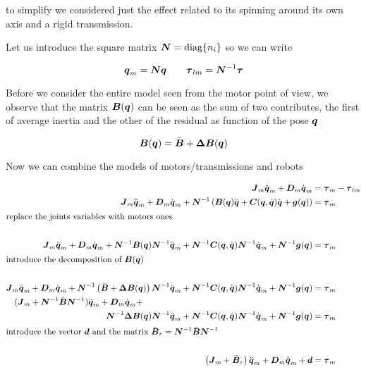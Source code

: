 to simplify we considered just the effect related to its spinning around its own axis and a rigid transmission.

Let us introduce the square matrix $\boldsymbol{N} = \operatorname{diag}\{n_i\}$ so we can write

\[
    \boldsymbol{q}_m = \boldsymbol{N} \boldsymbol{q} \qquad \boldsymbol{\tau}_{lm} = \boldsymbol{N}^{-1} \boldsymbol{\tau}
\]

Before we consider the entire model seen from the motor point of view, we observe that the matrix $\boldsymbol{B}(\boldsymbol{q})$ can be seen as the sum of two contributes, the first of average inertia and the other of the residual as function of the pose $\boldsymbol{q}$

\[
    \boldsymbol{B}(\boldsymbol{q}) = \bar{\boldsymbol{B}} + \boldsymbol{\Delta B}(\boldsymbol{q})
\]

Now we can combine the models of motors/transmissions and robots

\begin{align*}
    \matr J_m\ddq_m + \matr D_m \dq_m &= \vect \tau_m - \vect \tau_{lm} \\
    \matr J_m\ddq_m + \matr D_m \dq_m + \matr N^{-1} \left( \matr{B}(\q)\ddq +
    \matr{C}(\q,\dq)\dq + \vect{g}(\q) \right) &= \vect \tau_m \\
    \intertext{replace the joints variables with motors ones} \\
    \matr J_m\ddq_m + \matr D_m \dq_m + \matr N^{-1} \matr{B}(\q) \matr N^{-1} \ddq_m +
    \matr N^{-1} \matr{C}(\q,\dq) \matr N^{-1} \dq_m +
    \matr N^{-1} \vect{g}(\q) &= \vect \tau_m \\
    \intertext{introduce the decomposition of $\matr B(\q)$} \\
    \matr J_m\ddq_m + \matr D_m \dq_m + \matr N^{-1} \left(\bar{\matr B} + \matr{\Delta B}(\q)\right) \matr N^{-1} \ddq_m +
    \matr N^{-1} \matr{C}(\q,\dq) \matr N^{-1} \dq_m +
    \matr N^{-1} \vect{g}(\q) &= \vect \tau_m \\
    (\matr J_m + \matr N^{-1} \bar{\matr B} \matr N^{-1} )\ddq_m + \matr D_m \dq_m + \hspace{7cm} \\
    \matr N^{-1} \matr{\Delta B}(\q) \matr N^{-1} \ddq_m +
    \matr N^{-1} \matr{C}(\q,\dq) \matr N^{-1} \dq_m +
    \matr N^{-1} \vect{g}(\q) &= \vect \tau_m \\
    \intertext{introduce the vector $\vect d$ and the matrix $\bar{\matr B}_r = \matr N^{-1} \bar{\matr B} \matr N^{-1}$} \\
    \left(\matr J_m + \bar{\matr B}_r \right)\ddq_m + \matr D_m \dq_m + \vect d &= \vect \tau_m
\end{align*}

